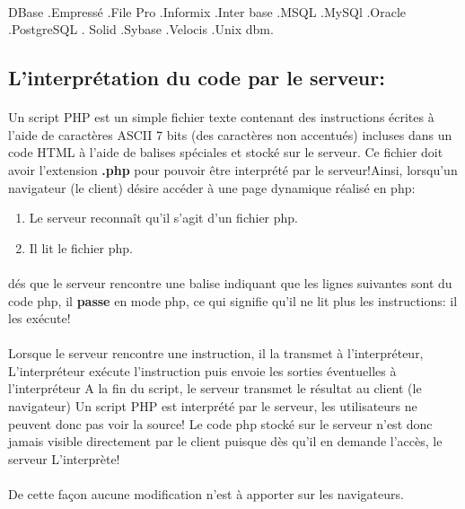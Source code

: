 \paragraph{}
DBase .Empressé .File Pro .Informix .Inter base .MSQL .MySQl .Oracle .PostgreSQL . Solid .Sybase .Velocis .Unix dbm.
\subsection{L'interprétation du code par le serveur:}
\paragraph{}
Un script PHP est un simple fichier texte contenant des instructions
écrites à l'aide de caractères ASCII 7 bits (des caractères non accentués)
incluses dans un code HTML à l'aide de balises spéciales et stocké sur le
serveur. Ce fichier doit avoir l'extension \textbf{.php} pour pouvoir être
interprété par le serveur!Ainsi, lorsqu'un navigateur (le client) désire
accéder à une page dynamique réalisé en php:
\begin{enumerate}
	\item Le serveur reconnaît qu'il s'agit d'un fichier php.
	\item Il lit le fichier php.
\end{enumerate}
\paragraph{}
dés que le serveur rencontre une balise indiquant que les lignes suivantes
sont du code php, il \textbf{passe} en mode php, ce qui signifie qu'il ne lit plus les instructions: il les exécute!
\paragraph{}
Lorsque le serveur rencontre une instruction, il la transmet à l'interpréteur, L'interpréteur exécute l'instruction puis envoie les sorties éventuelles à l'interpréteur A la fin du script, le serveur transmet le résultat au client (le navigateur) Un script PHP est interprété par le serveur, les utilisateurs ne peuvent donc pas voir la source! Le code php stocké sur le serveur n'est donc jamais visible directement par le client puisque dès qu'il en demande l'accès, le serveur L’interprète!

\paragraph{}
De cette façon aucune modification n'est à apporter sur les navigateurs.
